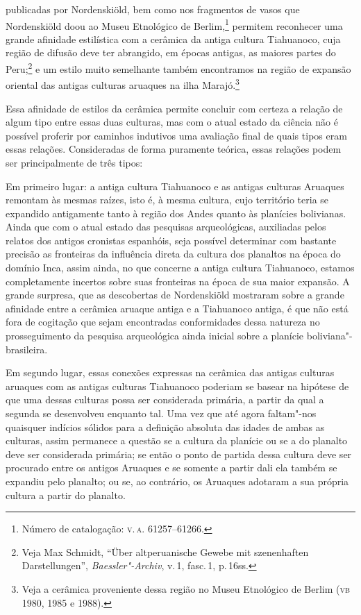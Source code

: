   publicadas por Nordenskiöld, bem como nos fragmentos de
vasos que Nordenskiöld doou ao Museu Etnológico de Berlim,\footnote{Número
  de catalogação: \textsc{v.\,a.} 61257--61266.} permitem reconhecer uma grande
afinidade estilística com a cerâmica da antiga cultura Tiahuanoco, cuja
região de difusão deve ter abrangido, em épocas antigas, as maiores
partes do Peru;\footnote{Veja Max Schmidt, ``Über altperuanische Gewebe
  mit szenenhaften Darstellungen'', \textit{Baessler"-Archiv}, v.\,1, fasc.\,1, p.\,16ss.} e um estilo muito semelhante também encontramos na
região de expansão oriental das antigas culturas aruaques na ilha
Marajó.\footnote{Veja a cerâmica proveniente dessa região no Museu
  Etnológico de Berlim (\textsc{vb} 1980, 1985 e 1988).}

Essa afinidade de estilos da cerâmica permite concluir com certeza a
relação de algum tipo entre essas duas culturas, mas com o atual estado
da ciência não é possível proferir por caminhos indutivos uma avaliação
final de quais tipos eram essas relações. Consideradas de forma
puramente teórica, essas relações podem ser principalmente de três
tipos:

Em primeiro lugar: a antiga cultura Tiahuanoco e as antigas culturas
Aruaques remontam às mesmas raízes, isto é, à mesma cultura, cujo
território teria se expandido antigamente tanto à região dos Andes
quanto às planícies bolivianas. Ainda que com o atual estado das
pesquisas arqueológicas, auxiliadas pelos relatos dos antigos cronistas
espanhóis, seja possível determinar com bastante precisão as fronteiras
da influência direta da cultura dos planaltos na época do domínio Inca,
assim ainda, no que concerne a antiga cultura Tiahuanoco, estamos
completamente incertos sobre suas fronteiras na época de sua maior
expansão. A grande surpresa, que as descobertas de Nordenskiöld
mostraram sobre a grande afinidade entre a cerâmica aruaque antiga e a
Tiahuanoco antiga, é que não está fora de cogitação que sejam
encontradas conformidades dessa natureza no prosseguimento da pesquisa
arqueológica ainda inicial sobre a planície boliviana"-brasileira.

Em segundo lugar, essas conexões expressas na cerâmica das antigas
culturas aruaques com as antigas culturas Tiahuanoco poderiam se basear
na hipótese de que uma dessas culturas possa ser considerada primária,
a partir da qual a segunda se desenvolveu enquanto tal. Uma vez que até
agora faltam"-nos quaisquer indícios sólidos para a definição absoluta
das idades de ambas as culturas, assim permanece a questão se a cultura
da planície ou se a do planalto deve ser considerada primária; se então
o ponto de partida dessa cultura deve ser procurado entre os antigos
Aruaques e se somente a partir dali ela também se expandiu pelo planalto;
ou se, ao contrário, os Aruaques adotaram a sua própria cultura a partir
do planalto.

